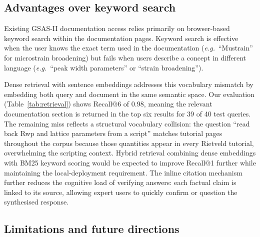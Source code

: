 \subsection{Advantages over keyword search}

Existing GSAS-II documentation access relies primarily on
browser-based keyword search within the documentation pages.
Keyword search is effective when the user knows the exact term
used in the documentation (\emph{e.g.}\ ``Mustrain'' for microstrain
broadening) but fails when users describe a concept in different
language (\emph{e.g.}\ ``peak width parameters'' or ``strain
broadening'').

Dense retrieval with sentence embeddings addresses this vocabulary
mismatch by embedding both query and document in the same semantic
space.
Our evaluation (Table~\ref{tab:retrieval}) shows Recall@6 of 0.98,
meaning the relevant documentation section is returned in the top
six results for 39 of 40 test queries.
The remaining miss reflects a structural vocabulary collision: the
question ``read back Rwp and lattice parameters from a script'' matches
tutorial pages throughout the corpus because those quantities appear
in every Rietveld tutorial, overwhelming the scripting context.
Hybrid retrieval combining dense embeddings with BM25 keyword scoring
would be expected to improve Recall@1 further while maintaining
the local-deployment requirement.
The inline citation mechanism further reduces the cognitive load of
verifying answers: each factual claim is linked to its source,
allowing expert users to quickly confirm or question the synthesised
response.

\subsection{Limitations and future directions}

